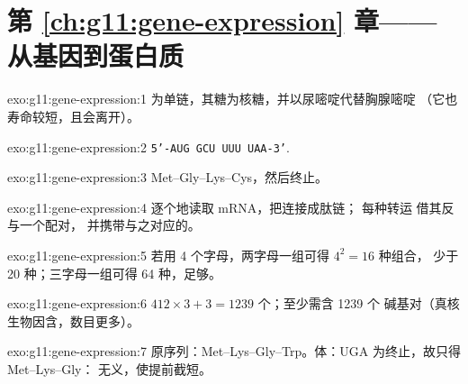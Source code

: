 \section*{第 \ref{ch:g11:gene-expression} 章——从基因到蛋白质}

\begin{solution}{exo:g11:gene-expression:1}
 为单链，其糖为核糖，并以尿嘧啶代替胸腺嘧啶
（它也寿命较短，且会离开）。
\end{solution}

\begin{solution}{exo:g11:gene-expression:2}
\texttt{5'-AUG GCU UUU UAA-3'}.
\end{solution}

\begin{solution}{exo:g11:gene-expression:3}
Met--Gly--Lys--Cys，然后终止。
\end{solution}

\begin{solution}{exo:g11:gene-expression:4}
逐个地读取 mRNA，把连接成肽链；
每种转运  借其反与一个配对，
并携带与之对应的。
\end{solution}

\begin{solution}{exo:g11:gene-expression:5}
若用 4 个字母，两字母一组可得 $4^2 = 16$ 种组合，
少于 20 种；三字母一组可得 64 种，足够。
\end{solution}

\begin{solution}{exo:g11:gene-expression:6}
$412 \times 3 + 3 = 1239$ 个；至少需含 1239 个
碱基对（真核生物因含，数目更多）。
\end{solution}

\begin{solution}{exo:g11:gene-expression:7}
原序列：Met--Lys--Gly--Trp。体：UGA 为终止，故只得 Met--Lys--Gly：
无义，使提前截短。
\end{solution}

